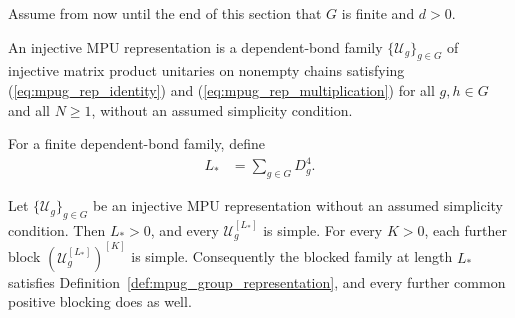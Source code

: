 Assume from now until the end of this section that $G$ is finite and $d>0$.

\begin{definition}
    \label{def:mpug_raw_group_representation}
    \leanok
    An injective MPU representation is a dependent-bond family
    $\{\mathcal U_g\}_{g\in G}$ of injective matrix product unitaries on
    nonempty chains satisfying (\ref{eq:mpug_rep_identity}) and
    (\ref{eq:mpug_rep_multiplication}) for all $g,h\in G$ and all $N\geq1$,
    without an assumed simplicity condition.
\end{definition}

\begin{definition}
    \label{def:mpug_common_simple_length}
    \leanok
    For a finite dependent-bond family, define
    \begin{align}
        L_* & =\sum_{g\in G}D_g^4.
        \label{eq:mpug_common_simple_length}
    \end{align}
\end{definition}

\begin{lemma}
    \label{thm:mpug_finite_common_simple_blocking}
    \leanok
    Let $\{\mathcal U_g\}_{g\in G}$ be an injective MPU representation without
    an assumed simplicity condition. Then $L_*>0$,
    and every $\mathcal U_g^{[L_*]}$ is simple. For every $K>0$, each further
    block $(\mathcal U_g^{[L_*]})^{[K]}$ is simple. Consequently the blocked
    family at length $L_*$ satisfies
    Definition~\ref{def:mpug_group_representation}, and every further common
    positive blocking does as well.
\end{lemma}

